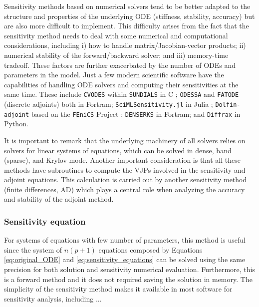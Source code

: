 
Sensitivity methods based on numerical solvers tend to be better adapted to the structure and properties of the underlying ODE (stiffness, stability, accuracy) but are also more difficult to implement.  
This difficulty arises from the fact that the sensitivity method needs to deal with some numerical and computational considerations, including i) how to handle matrix/Jacobian-vector products; ii) numerical stability of the forward/backward solver; and iii) memory-time tradeoff. 
These factors are further exacerbated by the number of ODEs and parameters in the model. 
Just a few modern scientific software have the capabilities of handling ODE solvers and computing their sensitivities at the same time. 
These include 
\texttt{CVODES} within \texttt{SUNDIALS} in C \cite{serban2005cvodes, SUNDIALS-hindmarsh2005sundials}; 
\texttt{ODESSA} \cite{ODESSA} and \texttt{FATODE} (discrete adjoints) \cite{FATODE2014} both in Fortram; 
\texttt{SciMLSensitivity.jl} in Julia \cite{rackauckas2020universal}; 
\texttt{Dolfin-adjoint} based on the \texttt{FEniCS} Project \cite{dolfin2013, dolfin2018};
\texttt{DENSERKS} in Fortram\cite{alexe2007denserks}; 
and \texttt{Diffrax} in Python\cite{kidger2021on}. 

It is important to remark that the underlying machinery of all solvers relies on solvers for linear systems of equations, which can be solved in dense, band (sparse), and Krylov mode. 
Another important consideration is that all these methods have subroutines to compute the VJPs involved in the sensitivity and adjoint equations. 
This calculation is carried out by another sensitivity method (finite differences, AD) which plays a central role when analyzing the accuracy and stability of the adjoint method. 

\subsubsection{Sensitivity equation}
\label{section:computing-sensitivity-equations}

For systems of equations with few number of parameters, this method is useful since the system of $n(p+1)$ equations composed by Equations \eqref{eq:original_ODE} and \eqref{eq:sensitivity_equations} can be solved using the same precision for both solution and sensitivity numerical evaluation. 
Furthermore, this is a forward method and it does not required saving the solution in memory. 
The simplicity of the sensitivity method makes it available in most software for sensitivity analysis, including ... 

